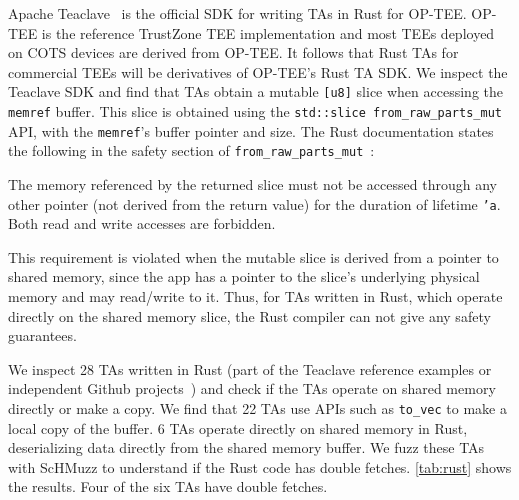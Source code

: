 \documentclass[conference]{IEEEtran}
\newcommand{\sysname}{ScHMuzz\xspace}
\newcommand{\optee}{OP-TEE\xspace}
\newcommand{\numRustTAs}{28\xspace}
\newcommand{\numRustTAsShm}{6\xspace}
\newcommand{\numRustTAsnoShm}{22\xspace}
\begin{document}

Apache Teaclave~\cite{rustee,teaclave} is the official SDK for writing TAs in Rust for \optee.
\optee is the reference TrustZone TEE implementation and most 
TEEs deployed on COTS devices are derived from \optee. 
It follows that Rust TAs for commercial TEEs will be derivatives  
of \optee's Rust TA SDK. We inspect the Teaclave SDK and find 
that TAs obtain a mutable \texttt{[u8]} slice when accessing 
the \texttt{memref} buffer. This slice is obtained using the 
\texttt{std::slice from\_raw\_parts\_mut} API, with the 
\texttt{memref}'s buffer pointer and size. The Rust documentation 
states the following in the safety section of \texttt{from\_raw\_parts\_mut}~\cite{rustfromraw}: 

\begin{tcolorbox}                                                                                                                   
The memory referenced by the returned slice must not be accessed through any other pointer (not derived from the return value) for the duration of lifetime \texttt{'a}. Both read and write accesses are forbidden.
\end{tcolorbox}

This requirement is violated when the mutable slice is derived from a 
pointer to shared memory, since the app has a pointer to the 
slice's underlying physical memory and may read/write to it. 
Thus, for TAs written in Rust, which operate directly on the shared 
memory slice, the Rust compiler can not give any safety guarantees.

We inspect \numRustTAs TAs written in Rust (part of the 
Teaclave reference examples or independent Github projects~\cite{teaclave,bitcoinrust}) and 
check if the TAs operate on shared memory directly or make a copy. 
We find that \numRustTAsnoShm TAs use APIs such as \texttt{to\_vec} to make a local copy of the buffer. 
\numRustTAsShm TAs operate directly on shared memory in Rust, deserializing data directly from the 
shared memory buffer. 
We fuzz these TAs with \sysname to understand if the Rust code has double fetches. 
\autoref{tab:rust} shows the results. Four of the six TAs have double fetches. 
\end{document}
